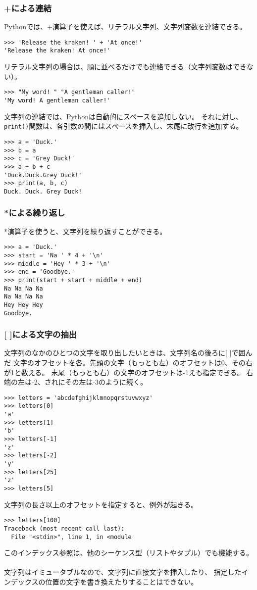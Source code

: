 \documentclass[11pt, oneside]{article}   	%
\begin{document}
\subsubsection{+による連結}
Pythonでは、+演算子を使えば、リテラル文字列、文字列変数を連結できる。
\begin{lstlisting}
>>> 'Release the kraken! ' + 'At once!'
'Release the kraken! At once!'
\end{lstlisting}
リテラル文字列の場合は、順に並べるだけでも連絡できる（文字列変数はできない）。
\begin{lstlisting}
>>> "My word! " "A gentleman caller!"
'My word! A gentleman caller!'
\end{lstlisting}
文字列の連結では、Pythonは自動的にスペースを追加しない。
それに対し、\verb|print()|関数は、各引数の間にはスペースを挿入し、末尾に改行を追加する。
\begin{lstlisting}
>>> a = 'Duck.'
>>> b = a
>>> c = 'Grey Duck!'
>>> a + b + c
'Duck.Duck.Grey Duck!'
>>> print(a, b, c)
Duck. Duck. Grey Duck!
\end{lstlisting}

\subsubsection{*による繰り返し}
*演算子を使うと、文字列を繰り返すことができる。
\begin{lstlisting}
>>> a = 'Duck.'
>>> start = 'Na ' * 4 + '\n'
>>> middle = 'Hey ' * 3 + '\n'
>>> end = 'Goodbye.'
>>> print(start + start + middle + end)
Na Na Na Na 
Na Na Na Na 
Hey Hey Hey 
Goodbye.
\end{lstlisting}

\subsubsection{[ ]による文字の抽出}
文字列のなかのひとつの文字を取り出したいときは、文字列名の後ろに[ ]で囲んだ
文字のオフセットを各。先頭の文字（もっとも左）のオフセットは0、その右が1と数える。
末尾（もっとも右）の文字のオフセットは-1えも指定できる。
右端の左は-2、されにその左は-3のように続く。
\begin{lstlisting}
>>> letters = 'abcdefghijklmnopqrstuvwxyz'
>>> letters[0]
'a'
>>> letters[1]
'b'
>>> letters[-1]
'z'
>>> letters[-2]
'y'
>>> letters[25]
'z'
>>> letters[5]
\end{lstlisting}
文字列の長さ以上のオフセットを指定すると、例外が起きる。
\begin{lstlisting}
>>> letters[100]
Traceback (most recent call last):
  File "<stdin>", line 1, in <module
\end{lstlisting}
このインデックス参照は、他のシーケンス型（リストやタプル）でも機能する。\\
 \\
 文字列はイミュータブルなので、文字列に直接文字を挿入したり、
 指定したインデックスの位置の文字を書き換えたりすることはできない。
 
\end{document}

